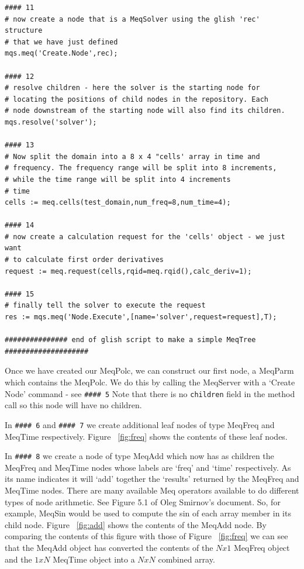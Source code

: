 \documentclass[10pt]{article}
\begin{document}
\begin{verbatim}
#### 11
# now create a node that is a MeqSolver using the glish 'rec' structure
# that we have just defined
mqs.meq('Create.Node',rec);

#### 12
# resolve children - here the solver is the starting node for
# locating the positions of child nodes in the repository. Each
# node downstream of the starting node will also find its children.
mqs.resolve('solver');

#### 13
# Now split the domain into a 8 x 4 "cells' array in time and
# frequency. The frequency range will be split into 8 increments, 
# while the time range will be split into 4 increments
# time
cells := meq.cells(test_domain,num_freq=8,num_time=4);

#### 14
# now create a calculation request for the 'cells' object - we just want 
# to calculate first order derivatives
request := meq.request(cells,rqid=meq.rqid(),calc_deriv=1);

#### 15
# finally tell the solver to execute the request
res := mqs.meq('Node.Execute',[name='solver',request=request],T);

############### end of glish script to make a simple MeqTree ####################
\end{verbatim}

Once we have created our MeqPolc, we can construct our first node, 
a MeqParm which contains the MeqPolc. We do this by calling the MeqServer
with a `Create Node' command - see  {\tt \#\#\#\# 5} Note that
there is no {\tt children} field in the method call so this
node will have no children.

In {\tt \#\#\#\# 6} and {\tt \#\#\#\# 7} we create additional leaf
nodes of type MeqFreq and MeqTime respectively.
Figure ~\ref{fig:freq} shows the contents of these
leaf nodes. 

In {\tt \#\#\#\# 8} we create a node of type MeqAdd which now has as 
children the MeqFreq and MeqTime nodes whose labels are `freq' and 
`time' respectively. As its name indicates it will `add' together the
`results' returned by the MeqFreq and MeqTime nodes. There are many available
Meq operators available to do different types of node arithmetic. See 
Figure 5.1 of Oleg Smirnov's \cite{smirnov} document. So, for example,
MeqSin would be used to compute the sin of each array member in its child node.
Figure ~\ref{fig:add} shows the contents of the MeqAdd node. By comparing the
contents of this figure with those of Figure ~\ref{fig:freq}
we can see that the MeqAdd object has converted the contents of
the $Nx1$ MeqFreq object and the $1xN$ MeqTime object into a $NxN$
combined array.
\end{document}
